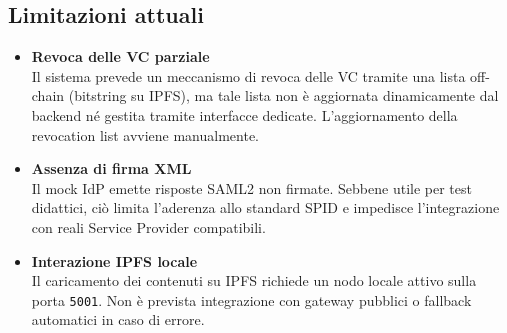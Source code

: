         \subsection{Limitazioni attuali}
            \begin{itemize}
                \item \textbf{Revoca delle VC parziale} \\
                Il sistema prevede un meccanismo di revoca delle VC tramite una lista off-chain (bitstring su IPFS), ma tale lista non è aggiornata dinamicamente dal backend né gestita tramite interfacce dedicate. L'aggiornamento della revocation list avviene manualmente.
            
                \item \textbf{Assenza di firma XML} \\
                Il mock IdP emette risposte SAML2 non firmate. Sebbene utile per test didattici, ciò limita l'aderenza allo standard SPID e impedisce l'integrazione con reali Service Provider compatibili.
            
                \item \textbf{Interazione IPFS locale} \\
                Il caricamento dei contenuti su IPFS richiede un nodo locale attivo sulla porta \texttt{5001}. Non è prevista integrazione con gateway pubblici o fallback automatici in caso di errore.
            \end{itemize}
        
